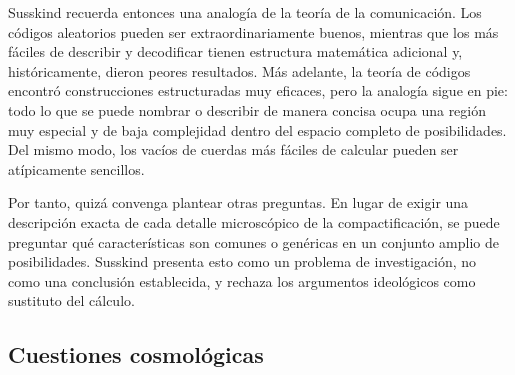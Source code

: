 Susskind recuerda entonces una analogía de la teoría de la comunicación. Los códigos aleatorios pueden ser extraordinariamente buenos, mientras que los más fáciles de describir y decodificar tienen estructura matemática adicional y, históricamente, dieron peores resultados. Más adelante, la teoría de códigos encontró construcciones estructuradas muy eficaces, pero la analogía sigue en pie: todo lo que se puede nombrar o describir de manera concisa ocupa una región muy especial y de baja complejidad dentro del espacio completo de posibilidades. Del mismo modo, los vacíos de cuerdas más fáciles de calcular pueden ser atípicamente sencillos.

Por tanto, quizá convenga plantear otras preguntas. En lugar de exigir una descripción exacta de cada detalle microscópico de la compactificación, se puede preguntar qué características son comunes o genéricas en un conjunto amplio de posibilidades. Susskind presenta esto como un problema de investigación, no como una conclusión establecida, y rechaza los argumentos ideológicos como sustituto del cálculo.

\subsection{Cuestiones cosmológicas}

\begin{classroomqa}
\end{classroomqa}

\begin{classroomqa}
\end{classroomqa}

